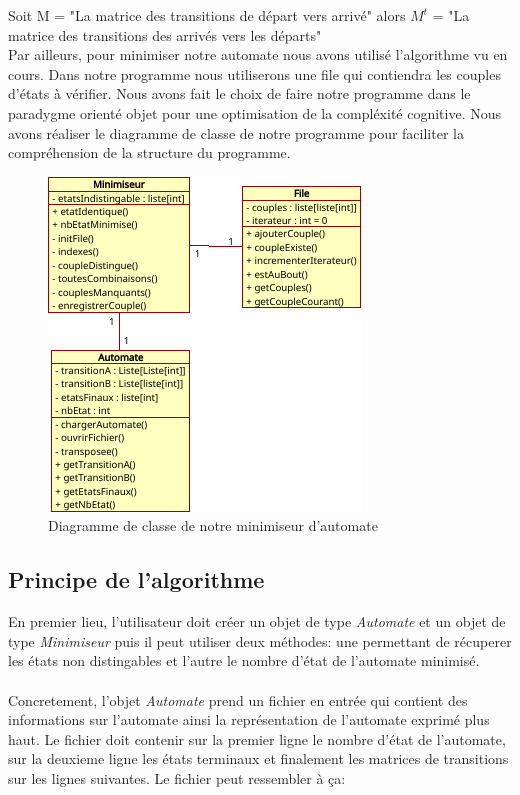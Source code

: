 \documentclass[a4paper]{article}
\begin{document}
Soit M = "La matrice des transitions de départ vers arrivé"
alors $M^t$ = "La matrice des transitions des arrivés vers les départs"\\

Par ailleurs, pour minimiser notre automate nous avons utilisé l'algorithme vu
en cours. Dans notre programme nous utiliserons une file qui contiendra les
couples d'états à vérifier. Nous avons fait le choix de faire notre programme
dans le paradygme orienté objet pour une optimisation de la compléxité cognitive.
Nous avons réaliser le diagramme de classe de notre programme pour faciliter
la compréhension de la structure du programme.

\begin{figure}[!h]
	\centering
	\includegraphics[scale=0.8]{src/diagramme_minimiseur.png}
	\caption{Diagramme de classe de notre minimiseur d'automate}
\end{figure}


\subsection{Principe de l'algorithme}

En premier lieu, l'utilisateur doit créer un objet de type \textit{Automate} et 
un objet de type \textit{Minimiseur} puis il peut utiliser deux méthodes:
une permettant de récuperer les états non distingables et l'autre le nombre
d'état de l'automate minimisé.\\

\fbox{
	
}\\

Concretement, l'objet \textit{Automate} prend un fichier en entrée qui contient des informations sur
l'automate ainsi la représentation de l'automate exprimé plus haut. Le fichier 
doit contenir sur la premier ligne le nombre d'état de l'automate, sur la deuxieme
ligne les états terminaux et finalement les matrices de transitions sur les lignes suivantes.
Le fichier peut ressembler à ça:\\
\end{document}
